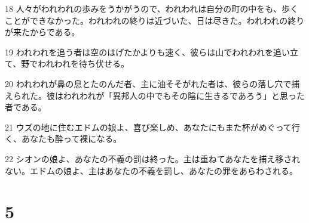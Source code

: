 \par 18 人々がわれわれの歩みをうかがうので、われわれは自分の町の中をも、歩くことができなかった。われわれの終りは近づいた、日は尽きた。われわれの終りが来たからである。
\par 19 われわれを追う者は空のはげたかよりも速く、彼らは山でわれわれを追い立て、野でわれわれを待ち伏せる。
\par 20 われわれが鼻の息とたのんだ者、主に油そそがれた者は、彼らの落し穴で捕えられた。彼はわれわれが「異邦人の中でもその陰に生きるであろう」と思った者である。
\par 21 ウズの地に住むエドムの娘よ、喜び楽しめ、あなたにもまた杯がめぐって行く、あなたも酔って裸になる。
\par 22 シオンの娘よ、あなたの不義の罰は終った。主は重ねてあなたを捕え移されない。エドムの娘よ、主はあなたの不義を罰し、あなたの罪をあらわされる。

\chapter{5}


